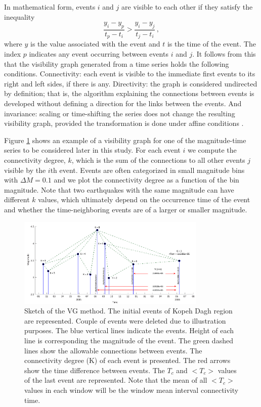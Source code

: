 In mathematical form, events $i$ and $j$ are visible to each other if they satisfy the inequality
%
\begin{equation}
	\frac{y_i - y_p }{t_p - t_i} > \frac{y_i - y_j}{ t_j - t_i} \, ,
\end{equation}
%
\noindent
where $y$ is the value associated with the event and $t$ is the time of the event. The index $p$ indicates any event occurring between events $i$  and $j$. It follows from this that the visibility graph generated from a time series holds the following conditions. Connectivity: each event is visible to the immediate first events to its right and left sides, if there is any. Directivity: the graph is considered undirected by definition; that is, the algorithm explaining the connections between events is developed without defining a direction for the links between the events. And invariance: scaling or time-shifting the series does not change the resulting visibility graph, provided the transformation is done under affine conditions \citep{Lacasa2008}.

Figure \ref{fig:vg} shows an example of a visibility graph for one of the magnitude-time series to be considered later in this study. For each event $i$ we compute the connectivity degree, $k$, which is the sum of the connections to all other events $j$ visible by the $i$th event. Events are often categorized in small magnitude bins with $\Delta M = 0.1$ and we plot the connectivity degree as a function of the bin magnitude. Note that two earthquakes with the same magnitude can have different $k$ values, which ultimately depend on the occurrence time of the event and whether the time-neighboring events are of a larger or smaller magnitude.

\begin{figure}[t]
	\centering
	\includegraphics[width=0.8\textwidth]{figures/pdf/Figure01} 
	\caption{Sketch of the VG method. The initial events of Kopeh Dagh region are represented. Couple of events were deleted due to illustration purposes. The blue vertical lines indicate the events. Height of each line is corresponding the magnitude of the event. The green dashed lines show the allowable connections between events. The connectivity degree (K) of each event is presented. The red arrows show the time difference between events. The $T_c$ and $< T_c >$ values of the last event are represented. Note that the mean of all $<T_c>$ values in each window will be the window mean interval connectivity time.}
	\label{fig:vg}
\end{figure}

